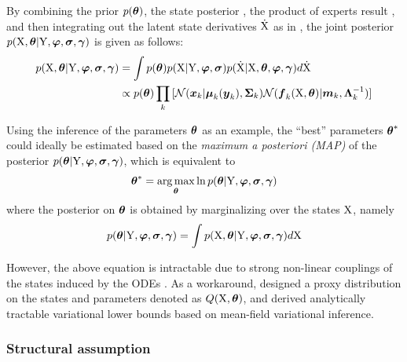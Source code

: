 By combining the prior $p(\boldsymbol{\theta})$, the state posterior  , the product of experts result , and then integrating out the latent state derivatives $\mathrm{\dot{X}}$ as in \cite{calderhead2009accelerating}, the joint posterior $p(\mathrm{X},\boldsymbol{\theta}\vert\mathrm{Y},\boldsymbol{\varphi},\boldsymbol{\sigma},\boldsymbol{\gamma})$ is given as follows:
\begin{align}
    p(\mathrm{X},\boldsymbol{\theta}\vert\mathrm{Y},\boldsymbol{\varphi},\boldsymbol{\sigma},\boldsymbol{\gamma}) 
    & = 
    \int{
        p(\boldsymbol{\theta})p(\mathrm{X}\vert\mathrm{Y},\boldsymbol{\ensuremath{\varphi}},\boldsymbol{\sigma}) p(\mathrm{\dot{X}}\vert\mathrm{X},\boldsymbol{\theta},\boldsymbol{\ensuremath{\varphi}},\boldsymbol{\gamma}) d\mathrm{\dot{X}}}
    \nonumber
    \\
    & \propto         
    p(\boldsymbol{\theta}) \prod_k{[
        \mathcal{N}(\boldsymbol{x}_{k}\vert\boldsymbol{\mu}_{k}(\boldsymbol{y}_{k}), \boldsymbol{\Sigma}_{k}) 
        \mathcal{N}(\boldsymbol{f}_{k}(\mathrm{X}, \boldsymbol{\theta})\vert\boldsymbol{m}_{k},\boldsymbol{\Lambda}_{k}^{-1})]}    
    \label{eq-vgmgp-posterior-joint}
\end{align}

Using the inference of the parameters $\boldsymbol{\theta}$ as an example, the ``best'' parameters $\boldsymbol{\theta}^*$ could ideally be estimated based on the \emph{maximum a posteriori (MAP)} of the posterior $p(\boldsymbol{\theta}\vert\mathrm{Y},\boldsymbol{\varphi},\boldsymbol{\sigma},\boldsymbol{\gamma})$, which is equivalent to
\begin{align}
    \boldsymbol{\theta}^* = \operatorname*{arg\,max}_{\boldsymbol{\theta}}\ln{p(\boldsymbol{\theta}\vert\mathrm{Y},\boldsymbol{\ensuremath{\varphi}},\boldsymbol{\sigma},\boldsymbol{\gamma})}
    \label{eq-vgmgp-theta-posterior}
\end{align}
where the posterior on $\boldsymbol{\theta}$ is obtained by marginalizing  over the states $\mathrm{X}$, namely
\begin{align}
    p(\boldsymbol{\theta}\vert\mathrm{Y},\boldsymbol{\varphi},\boldsymbol{\sigma},\boldsymbol{\gamma}) = \int{p(\mathrm{X},\boldsymbol{\theta}\vert\mathrm{Y},\boldsymbol{\ensuremath{\varphi}},\boldsymbol{\sigma},\boldsymbol{\gamma})d\mathrm{X}}
    \nonumber
\end{align} 

However, the above equation is intractable due to strong non-linear couplings of the states induced by the ODEs .
As a workaround, \cite{gorbach2017scalable} designed a proxy distribution on the states and parameters denoted as $Q(\mathrm{X}, \boldsymbol{\theta})$, and derived analytically tractable variational lower bounds based on mean-field variational inference.

\subsubsection*{Structural assumption}

